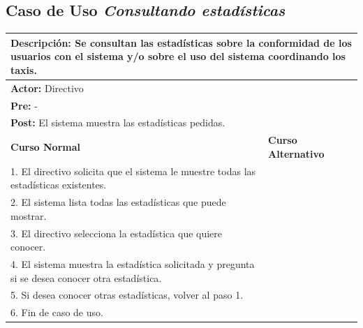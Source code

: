 \documentclass[a4paper]{article}
\begin{document}
\subsection{Caso de Uso \textit{Consultando estad\'isticas}}
\begin{center}
\begin{tabular}{|p{10cm} | p{6cm}|}
\hline
\multicolumn{2}{|p{16cm}|}{\textbf{Descripci\'on:} Se consultan las estad\'isticas sobre la conformidad de los usuarios con el sistema y/o sobre el uso del sistema coordinando los taxis. } \\
\hline
\multicolumn{2}{|l|}{\textbf{Actor:} Directivo } \\
\hline
\multicolumn{2}{|l|}{\textbf{Pre:} - } \\
\hline
\multicolumn{2}{|p{14cm}|}{\textbf{Post:} El sistema muestra las estad\'isticas pedidas. }\\
\hline
\textbf{Curso Normal}  & \textbf{Curso Alternativo} \\ \hline
1. El directivo solicita que el sistema le muestre todas las estad\'isticas existentes. & \\ \hline
2. El sistema lista todas las estad\'isticas que puede mostrar. & \\ \hline
3. El directivo selecciona la estad\'istica que quiere conocer. & \\ \hline
4. El sistema muestra la estad\'istica solicitada y pregunta si se desea conocer otra estad\'istica. &  \\ \hline
5. Si desea conocer otras estad\'isticas, volver al paso 1. \\ \hline
6. Fin de caso de uso. & \\ \hline
\end{tabular}
\end{center}
\end{document}
